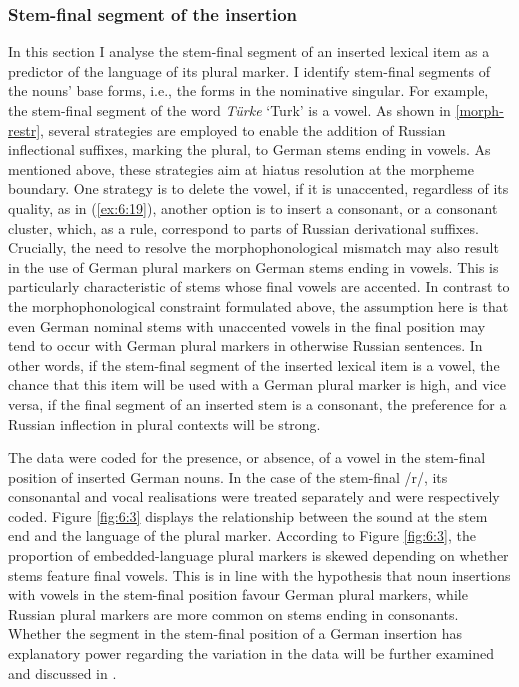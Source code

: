 \subsubsection{Stem-final segment of the insertion}

\noindent In this section I analyse the stem-final segment of an inserted lexical item as a predictor of the language of its plural marker. I identify stem-final segments of the nouns’ base forms, i.e., the forms in the nominative singular. For example, the stem-final segment of the word \textit{Türke} `Turk' is a vowel. As shown in \ref{morph-restr}, several strategies are employed to enable the addition of Russian inflectional suffixes, marking the plural, to German stems ending in vowels. As mentioned above, these strategies aim at hiatus resolution at the morpheme boundary. One strategy is to delete the vowel, if it is unaccented, regardless of its quality, as in (\ref{ex:6:19}), another option is to insert a consonant, or a consonant cluster, which, as a rule, correspond to parts of Russian derivational suffixes. Crucially, the need to resolve the morphophonological mismatch may also result in the use of German plural markers on German stems ending in vowels. This is particularly characteristic of stems whose final vowels are accented. In contrast to the morphophonological constraint formulated above, the assumption here is that even German nominal stems with unaccented vowels in the final position may tend to occur with German plural markers in otherwise Russian sentences. In other words, if the stem-final segment of the inserted lexical item is a vowel, the chance that this item will be used with a German plural marker is high, and vice versa, if the final segment of an inserted stem is a consonant, the preference for a Russian inflection in plural contexts will be strong.

The data were coded for the presence, or absence, of a vowel in the stem-final position of inserted German nouns. In the case of the stem-final /r/, its consonantal and vocal realisations were treated separately and were respectively coded. Figure \ref{fig:6:3} displays the relationship between the sound at the stem end and the language of the plural marker. According to Figure \ref{fig:6:3}, the proportion of embedded-language plural markers is skewed depending on whether stems feature final vowels. This is in line with the hypothesis that noun insertions with vowels in the stem-final position favour German plural markers, while Russian plural markers are more common on stems ending in consonants. Whether the segment in the stem-final position of a German insertion has explanatory power regarding the variation in the data will be further examined and discussed in .

